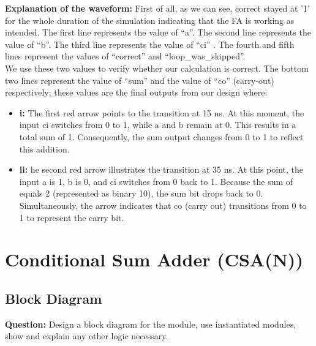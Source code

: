 \documentclass[12pt]{article}
\begin{document}
\noindent \textbf{Explanation of the waveform:}
First of all, as we can see, correct stayed at ’1’ for the whole duration of the simulation indicating that the FA is working as intended.
The first line represents the value of ``a''. 
The second line represents the value of ``b''. 
The third line represents the value of ``ci'' . 
The fourth and fifth lines represent the values of ``correct'' and ``loop\_was\_skipped''.\\ We use these two values to verify whether our calculation is correct. 
The bottom two lines represent the value of ``sum'' and the value of ``co'' (carry-out) respectively; these values are the final outputs from our design where:
\vspace{0.1 cm}
\begin{itemize}
    \item \textbf{i:} The first red arrow points to the transition at 15 ns. At this moment, the input ci switches from 0 to 1, while a and b remain at 0. This results in a total sum of 1. Consequently, the sum output changes from 0 to 1 to reflect this addition.
    \item \textbf{ii:} he second red arrow illustrates the transition at 35 ns. At this point, the input a is 1, b is 0, and ci switches from 0 back to 1. Because the sum of equals 2 (represented as binary 10), the sum bit drops back to 0. Simultaneously, the arrow indicates that co (carry out) transitions from 0 to 1 to represent the carry bit.
\end{itemize}

\vspace{4cm} %
\newpage


\section{Conditional Sum Adder (CSA(N))}

\subsection{Block Diagram}
\noindent \textbf{Question:} Design a block diagram for the module, use instantiated modules, show and explain any other logic necessary.
\end{document}
